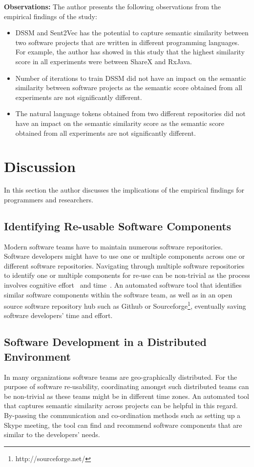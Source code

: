 \documentclass[conference]{IEEEtran}
\begin{document}
\textbf{Observations: } The author presents the following observations from the empirical findings of the study: 
\begin{itemize}
\item{ DSSM and Sent2Vec has the potential to capture semantic similarity between two software projects that are written in different programming languages. For example, the author has showed in this study that the highest similarity score in all experiments were between ShareX and RxJava. }
\item{Number of iterations to train DSSM did not have an impact on the semantic similarity between software projects as the semantic score obtained from all experiments are not significantly different. }
\item{The natural language tokens obtained from two different repositories did not have an impact on the semantic similarity score as the semantic score obtained from all experiments are not significantly different. }
\end{itemize}



\section{Discussion}
\label{discussion}
In this section the author discusses the implications of the empirical findings for programmers and researchers.  
\subsection{Identifying Re-usable Software Components}
Modern software teams have to maintain numerous software repositories. Software developers might have to use one or multiple components across one or different software repositories. Navigating through multiple software repositories to identify one or multiple components for re-use can be non-trivial as the process involves cognitive effort~\cite{parnin:MRI:brain:programming} and time~\cite{zimmerman:code:search}. An automated software tool that identifies similar software components within the software team, as well as in an open source software repository hub such as Github or Sourceforge\footnote{http://sourceforge.net/}, eventually saving software developers' time and effort.          
\subsection{Software Development in a Distributed Environment}
In many organizations software teams are geo-graphically distributed. For the purpose of software re-usability, coordinating amongst such distributed teams can be non-trivial as these teams might be in different time zones. An automated tool that captures semantic similarity across projects can be helpful in this regard. By-passing the communication and co-ordination methods such as setting up a Skype meeting, the tool can find and recommend software components that are similar to the developers' needs.   
\end{document}
